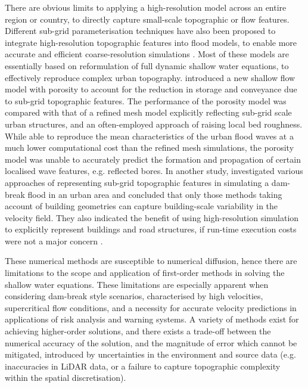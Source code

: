 There are obvious limits to applying a high-resolution model across an entire region or country, to directly capture small-scale topographic or flow features. Different sub-grid parameterisation techniques have also been proposed to integrate high-resolution topographic features into flood models, to enable more accurate and efficient coarse-resolution simulations \citep[e.g.][]{Soares-Frazao2008,Guinot2012,Schubert2012,Chen2012}. Most of these models are essentially based on reformulation of full dynamic shallow water equations, to effectively reproduce complex urban topography. \citet{Soares-Frazao2008} introduced a new shallow flow model with porosity to account for the reduction in storage and conveyance due to sub-grid topographic features. The performance of the porosity model was compared with that of a refined mesh model explicitly reflecting sub-grid scale urban structures, and an often-employed approach of raising local bed roughness. While able to reproduce the mean characteristics of the urban flood waves at a much lower computational cost than the refined mesh simulations, the porosity model was unable to accurately predict the formation and propagation of certain localised wave features, e.g. reflected bores. In another study, \citet{Schubert2012} investigated various approaches of representing sub-grid topographic features in simulating a dam-break flood in an urban area and concluded that only those methods taking account of building geometries can capture building-scale variability in the velocity field. They also indicated the benefit of using high-resolution simulation to explicitly represent buildings and road structures, if run-time execution costs were not a major concern \citep[see also][]{Gallegos2009}.

These numerical methods are susceptible to numerical diffusion, hence there are limitations to the scope and application of first-order methods in solving the shallow water equations. These limitations are especially apparent when considering dam-break style scenarios, characterised by high velocities, supercritical flow conditions, and a necessity for accurate velocity predictions in applications of risk analysis and warning systems. A variety of methods exist for achieving higher-order solutions, and there exists a trade-off between the numerical accuracy of the solution, and the magnitude of error which cannot be mitigated, introduced by uncertainties in the environment and source data (e.g. inaccuracies in LiDAR data, or a failure to capture topographic complexity within the spatial discretisation).

